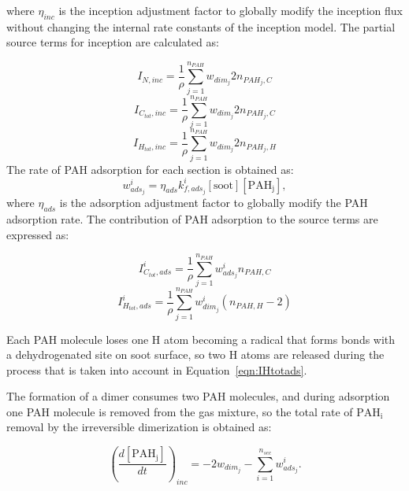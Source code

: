 \noindent where $\eta_{inc}$ is the inception adjustment factor to globally modify the inception flux without changing the internal rate constants of the inception model. The partial source terms for inception are calculated as:

\begin{equation}
	I_{N,inc} =\frac{1}{\rho} \sum_{j=1}^{n_{PAH}} w_{dim_j} 2n_{PAH_j,C}
	\label{eqn:INinc}
\end{equation}
\begin{equation}
	I_{C_{tot},inc} = \frac{1}{\rho}\sum_{j=1}^{n_{PAH}} w_{dim_j} 2n_{PAH_j,C}
	\label{eqn:ICtotinc}
\end{equation}
\begin{equation}
	I_{H_{tot},inc} =\frac{1}{\rho} \sum_{j=1}^{n_{PAH}} w_{dim_j} 2n_{PAH_j,H}
	\label{eqn:IHtotinc}
\end{equation}
The rate of PAH adsorption for each section is obtained as:
\begin{equation}
	w^i_{ads_j} = \eta_{ads} k^i_{f,ads_{j}} [\mathrm{soot}] [\mathrm{PAH_j}]
	\label{eqn:adsrate_irrevdim},
\end{equation}
\noindent where $\eta_{ads}$ is the adsorption adjustment factor to globally modify the PAH adsorption rate. The contribution of PAH adsorption to the source terms are expressed as:

\begin{equation}
	I^i_{C_{tot},ads} = \frac{1}{\rho}\sum_{j=1}^{n_{PAH}} w^i_{ads_j} n_{PAH,C}
	\label{eqn:ICtotads}
\end{equation}
\begin{equation}
	I^i_{H_{tot},ads} =\frac{1}{\rho} \sum_{j=1}^{n_{PAH}} w^i_{dim_j} (n_{PAH,H}-2)
	\label{eqn:IHtotads}
\end{equation}


Each PAH molecule loses one H atom becoming a radical that forms bonds with a dehydrogenated site on soot surface, so two H atoms are released during the process that is taken into account in Equation~\eqref{eqn:IHtotads}.

The formation of a dimer consumes two PAH molecules, and during adsorption one PAH molecule is removed from the gas mixture, so the total rate of $\mathrm{PAH_i}$ removal by the irreversible dimerization is obtained as:

\begin{equation}
	\left(
	\frac{d\left[{\mathrm{PAH_j}}\right]}{dt}
	\right)_{inc}
	= 
	-2w_{dim_j}-\sum_{i=1}^{n_{sec}}w^i_{ads_j}
	\label{eqn:PAHscrub_irrevdim}.
\end{equation}

